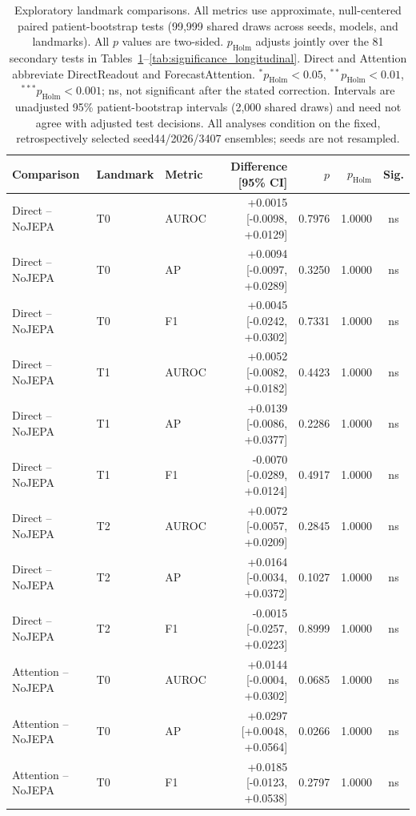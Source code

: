 \begin{table}[t]
\centering
\small
\caption{Exploratory landmark comparisons. All metrics use approximate, null-centered paired patient-bootstrap tests (99,999 shared draws across seeds, models, and landmarks). All $p$ values are two-sided. $p_{\mathrm{Holm}}$ adjusts jointly over the 81 secondary tests in Tables~\ref{tab:significance_landmarks}--\ref{tab:significance_longitudinal}. Direct and Attention abbreviate DirectReadout and ForecastAttention. $^{*}p_{\mathrm{Holm}}<0.05$, $^{**}p_{\mathrm{Holm}}<0.01$, $^{***}p_{\mathrm{Holm}}<0.001$; ns, not significant after the stated correction. Intervals are unadjusted 95\% patient-bootstrap intervals (2,000 shared draws) and need not agree with adjusted test decisions. All analyses condition on the fixed, retrospectively selected seed44/2026/3407 ensembles; seeds are not resampled.}
\label{tab:significance_landmarks}
\begin{tabular}{lllrrrc}
\toprule
Comparison & Landmark & Metric & Difference [95\% CI] & $p$ & $p_{\mathrm{Holm}}$ & Sig. \\
\midrule
Direct -- NoJEPA & T0 & AUROC & +0.0015 [-0.0098, +0.0129] & 0.7976 & 1.0000 & ns \\
Direct -- NoJEPA & T0 & AP & +0.0094 [-0.0097, +0.0289] & 0.3250 & 1.0000 & ns \\
Direct -- NoJEPA & T0 & F1 & +0.0045 [-0.0242, +0.0302] & 0.7331 & 1.0000 & ns \\
Direct -- NoJEPA & T1 & AUROC & +0.0052 [-0.0082, +0.0182] & 0.4423 & 1.0000 & ns \\
Direct -- NoJEPA & T1 & AP & +0.0139 [-0.0086, +0.0377] & 0.2286 & 1.0000 & ns \\
Direct -- NoJEPA & T1 & F1 & -0.0070 [-0.0289, +0.0124] & 0.4917 & 1.0000 & ns \\
Direct -- NoJEPA & T2 & AUROC & +0.0072 [-0.0057, +0.0209] & 0.2845 & 1.0000 & ns \\
Direct -- NoJEPA & T2 & AP & +0.0164 [-0.0034, +0.0372] & 0.1027 & 1.0000 & ns \\
Direct -- NoJEPA & T2 & F1 & -0.0015 [-0.0257, +0.0223] & 0.8999 & 1.0000 & ns \\
Attention -- NoJEPA & T0 & AUROC & +0.0144 [-0.0004, +0.0302] & 0.0685 & 1.0000 & ns \\
Attention -- NoJEPA & T0 & AP & +0.0297 [+0.0048, +0.0564] & 0.0266 & 1.0000 & ns \\
Attention -- NoJEPA & T0 & F1 & +0.0185 [-0.0123, +0.0538] & 0.2797 & 1.0000 & ns \\

\end{tabular}
\end{table}
